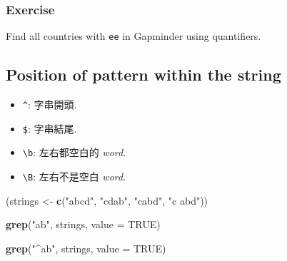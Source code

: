 \documentclass[]{book}
\newenvironment{Shaded}{\begin{snugshade}}{\end{snugshade}}
\newcommand{\DataTypeTok}[1]{\textcolor[rgb]{0.13,0.29,0.53}{#1}}
\newcommand{\KeywordTok}[1]{\textcolor[rgb]{0.13,0.29,0.53}{\textbf{#1}}}
\newcommand{\NormalTok}[1]{#1}
\newcommand{\OtherTok}[1]{\textcolor[rgb]{0.56,0.35,0.01}{#1}}
\newcommand{\StringTok}[1]{\textcolor[rgb]{0.31,0.60,0.02}{#1}}
\providecommand{\tightlist}{%
  \setlength{\itemsep}{0pt}\setlength{\parskip}{0pt}}
\theoremstyle{definition}
\theoremstyle{definition}
\theoremstyle{definition}
\theoremstyle{remark}
\begin{document}
\hypertarget{exercise}{%
\subsubsection{Exercise}\label{exercise}}

Find all countries with \texttt{ee} in Gapminder using quantifiers.

\hypertarget{position-of-pattern-within-the-string}{%
\subsection{Position of pattern within the
string}\label{position-of-pattern-within-the-string}}

\begin{itemize}
\tightlist
\item
  \texttt{\^{}}: 字串開頭.\\
\item
  \texttt{\$}: 字串結尾.\\
\item
  \texttt{\textbackslash{}b}: 左右都空白的 \emph{word}.\\
\item
  \texttt{\textbackslash{}B}: 左右不是空白 \emph{word}.
\end{itemize}

\begin{Shaded}
\begin{Highlighting}[]
\NormalTok{(strings <-}\StringTok{ }\KeywordTok{c}\NormalTok{(}\StringTok{"abcd"}\NormalTok{, }\StringTok{"cdab"}\NormalTok{, }\StringTok{"cabd"}\NormalTok{, }\StringTok{"c abd"}\NormalTok{))}
\end{Highlighting}
\end{Shaded}

\begin{Shaded}
\begin{Highlighting}[]
\KeywordTok{grep}\NormalTok{(}\StringTok{"ab"}\NormalTok{, strings, }\DataTypeTok{value =} \OtherTok{TRUE}\NormalTok{)}
\end{Highlighting}
\end{Shaded}

\begin{Shaded}
\begin{Highlighting}[]
\KeywordTok{grep}\NormalTok{(}\StringTok{"^ab"}\NormalTok{, strings, }\DataTypeTok{value =} \OtherTok{TRUE}\NormalTok{)}
\end{Highlighting}
\end{Shaded}
\end{document}
